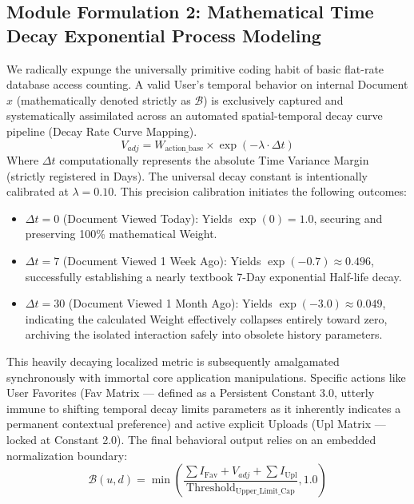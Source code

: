 \documentclass[journal]{IEEEtran}
\begin{document}
\subsection{Module Formulation 2: Mathematical Time Decay Exponential Process Modeling}

We radically expunge the universally primitive coding habit of basic flat-rate database access counting. 
A valid User's temporal behavior on internal Document $x$ (mathematically denoted strictly as $\mathcal{B}$) is exclusively captured and systematically assimilated 
across an automated spatial-temporal decay curve pipeline (Decay Rate Curve Mapping).
\begin{equation}
\label{eq:decay}
V_{adj} = W_{\text{action\_base}} \times \exp(-\lambda \cdot \Delta t)
\end{equation}
Where $\Delta t$ computationally represents the absolute Time Variance Margin (strictly registered in Days). 
The universal decay constant is intentionally calibrated at $ \lambda = 0.10 $. 
This precision calibration initiates the following outcomes:
\begin{itemize}
    \item $ \Delta t = 0 $ (Document Viewed Today): Yields $\exp(0) = 1.0$, securing and preserving 100\% mathematical Weight.
    \item $ \Delta t = 7 $ (Document Viewed 1 Week Ago): Yields $\exp(-0.7) \approx 0.496$, successfully establishing a nearly textbook 7-Day exponential Half-life decay.
    \item $ \Delta t = 30 $ (Document Viewed 1 Month Ago): Yields $\exp(-3.0) \approx 0.049$, indicating the calculated Weight effectively collapses entirely toward zero, archiving the isolated interaction safely into obsolete history parameters.
\end{itemize}

This heavily decaying localized metric is subsequently amalgamated synchronously with immortal core application manipulations. 
Specific actions like User Favorites (Fav Matrix --- defined as a Persistent Constant 3.0, utterly immune to shifting temporal decay limits parameters as it inherently indicates a permanent contextual preference) 
and active explicit Uploads (Upl Matrix --- locked at Constant 2.0). 
The final behavioral output relies on an embedded normalization boundary:
\begin{equation}
\label{eq:behavior_limit}
\mathcal{B}(u,d) = \min\left( \frac{\sum I_{\text{Fav}} + V_{adj} + \sum I_{\text{Upl}}}{\text{Threshold}_{\text{Upper\_Limit\_Cap}}}, 1.0 \right)
\end{equation}
\end{document}
